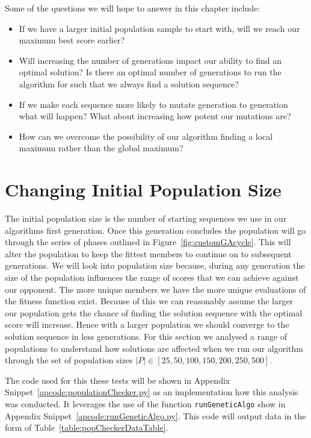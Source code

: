Some of the questions we will hope to answer in this chapter include:
\begin{itemize}
    \item If we have a larger initial population sample to start with, will we reach our maximum best score earlier?
    \item Will increasing the number of generations impact our ability to find an optimal solution? Is there an optimal number of generations to run the algorithm for such that we always find a solution sequence?
    \item If we make each sequence more likely to mutate generation to generation what will happen?
    What about increasing how potent our mutations are?
    \item How can we overcome the possibility of our algorithm finding a local maximum rather than the global maximum?
\end{itemize}

\section{Changing Initial Population Size}\label{sec:ChangingInitialPopulationSize}
The initial population size is the number of starting sequences we use in our algorithms first generation.
Once this generation concludes the population will go through the series of phases outlined in Figure~\ref{fig:customGAcycle}.
This will alter the population to keep the fittest members to continue on to subsequent generations.
We will look into population size because, during any generation the size of the population influences the range of scores that we can achieve against our opponent.
The more unique members we have the more unique evaluations of the fitness function exist.
Because of this we can reasonably assume the larger our population gets the chance of finding the solution sequence with the optimal score will increase.
Hence with a larger population we should converge to the solution sequence in less generations.
For this section we analysed a range of populations to understand how solutions are affected when we run our algorithm through the set of population sizes \(|P| \in [25,50,100,150,200,250,500]\).

The code used for this these tests will be shown in Appendix Snippet~\ref{apcode:populationChecker.py} as an implementation how this analysis was conducted.
It leverages the use of the function \texttt{runGeneticAlgo} show in Appendix Snippet~\ref{apcode:runGeneticAlgo.py}.
This code will output data in the form of Table~\ref{table:popCheckerDataTable}.

